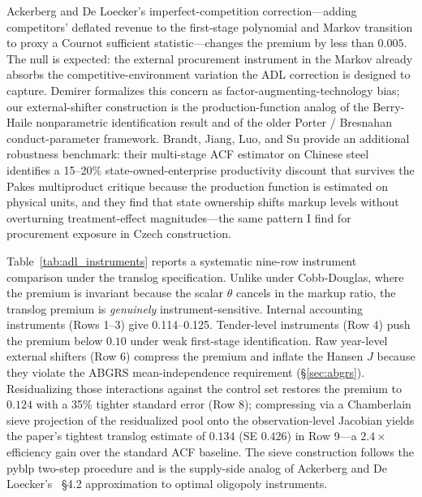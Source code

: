 \documentclass[11pt]{article}
\begin{document}
Ackerberg and De Loecker's \cite{ADL2024} imperfect-competition correction---adding competitors' deflated revenue to the first-stage polynomial and Markov transition to proxy a Cournot sufficient statistic---changes the premium by less than $0.005$. The null is expected: the external procurement instrument in the Markov already absorbs the competitive-environment variation the ADL correction is designed to capture. Demirer \cite{Demirer2025} formalizes this concern as factor-augmenting-technology bias; our external-shifter construction is the production-function analog of the Berry-Haile \cite{BerryHaile2014} nonparametric identification result and of the older Porter \cite{Porter1983} / Bresnahan \cite{Bresnahan1987} conduct-parameter framework. Brandt, Jiang, Luo, and Su \cite{BrandtJiangLuoSu2022} provide an additional robustness benchmark: their multi-stage ACF estimator on Chinese steel identifies a 15--20\% state-owned-enterprise productivity discount that survives the Pakes multiproduct critique because the production function is estimated on physical units, and they find that state ownership shifts markup levels without overturning treatment-effect magnitudes---the same pattern I find for procurement exposure in Czech construction.

Table~\ref{tab:adl_instruments} reports a systematic nine-row instrument comparison under the translog specification. Unlike under Cobb-Douglas, where the premium is invariant because the scalar $\theta$ cancels in the markup ratio, the translog premium is \emph{genuinely} instrument-sensitive. Internal accounting instruments (Rows 1--3) give 0.114--0.125. Tender-level instruments (Row 4) push the premium below $0.10$ under weak first-stage identification. Raw year-level external shifters (Row 6) compress the premium and inflate the Hansen $J$ because they violate the ABGRS \cite{ABGRS2025} mean-independence requirement (\S\ref{sec:abgrs}). Residualizing those interactions against the control set restores the premium to $0.124$ with a 35\% tighter standard error (Row 8); compressing via a Chamberlain \cite{Chamberlain1987, Chamberlain2022} sieve projection of the residualized pool onto the observation-level Jacobian yields the paper's tightest translog estimate of $0.134$ (SE $0.426$) in Row 9---a $2.4\times$ efficiency gain over the standard ACF baseline. The sieve construction follows the pyblp two-step procedure \cite{ConlonGortmaker2020} and is the supply-side analog of Ackerberg and De Loecker's \cite{ADL2024}~\S4.2 approximation to optimal oligopoly instruments.
\end{document}
